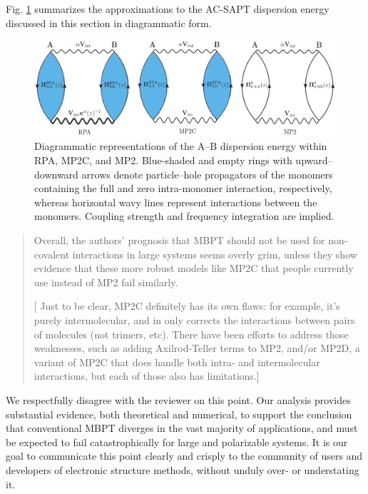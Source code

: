 \documentclass[journal=jctcce,manuscript=article]{achemso}
\newcommand*{\rev}[1]{{\color{blue} #1}}
\newenvironment{reviewer}%
{\begin{quote}%
  \begin{changebar}\cbcolor{gray}\color{black}}%
  {\end{changebar}%
\end{quote}}
\begin{document}
\rev{Fig. \ref{fig:mp2c_rpa} summarizes the approximations to the AC-SAPT
dispersion energy discussed in this section in diagrammatic form.}
\begin{figure}[H]
  \centering
  \includegraphics{int_gold_combine.eps}
  \caption{\rev{Diagrammatic representations of the A--B dispersion energy
    within RPA, MP2C, and MP2. Blue-shaded and empty rings
    with upward--downward arrows denote particle--hole propagators
    of the monomers containing the full and zero intra-monomer
    interaction, respectively,
    whereas horizontal wavy lines represent interactions between the
    monomers. Coupling strength and frequency integration are
    implied.}}
  \label{fig:mp2c_rpa}
\end{figure}

\begin{reviewer}
Overall, the authors' prognosis that MBPT should not be used for non-covalent
interactions in large systems seems overly grim, unless they show evidence
that these more robust models like MP2C that people currently use instead of
MP2 fail similarly.

[ Just to be clear, MP2C definitely has its own flaws: for example, it's purely
intermolecular, and in only corrects the interactions between pairs of molecules
(not trimers, etc). There have been efforts to address those weaknesses, such
as adding Axilrod-Teller terms to MP2, and/or MP2D, a variant of MP2C that does
handle both intra- and intermolecular interactions, but each of those also has
limitations.]

\end{reviewer}

We respectfully disagree with the reviewer on this point. Our analysis
provides substantial evidence, both theoretical and numerical, to
support the conclusion that conventional MBPT diverges in the vast
majority of applications, and must be expected to fail catastrophically
for large and polarizable systems. It is our goal to
communicate this point clearly and crisply to the community of users and
developers of electronic structure methods, without unduly over- or
understating it.
\end{document}
